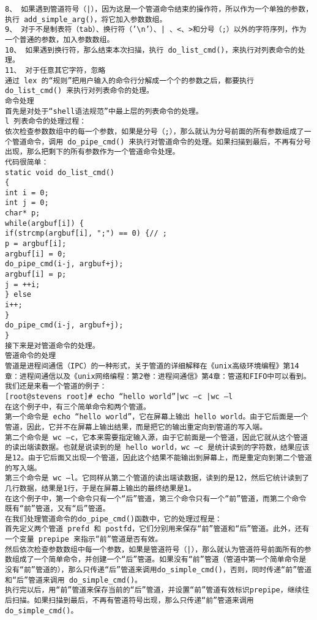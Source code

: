 \begin{lstlisting}
8、 如果遇到管道符号（|），因为这是一个管道命令结束的操作符，所以作为一个单独的参数，执行 add_simple_arg()，将它加入参数数组。 
9、 对于不是制表符（tab）、换行符（’\n’）、| 、<、>和分号（;）以外的字符序列，作为一个普通的参数，加入参数数组。 
10、 如果遇到换行符，那么结束本次扫描，执行 do_list_cmd()，来执行对列表命令的处理。 
11、 对于任意其它字符，忽略 
通过 lex 的“规则”把用户输入的命令行分解成一个个的参数之后，都要执行 do_list_cmd() 来执行对列表命令的处理。 
命令处理 
首先是对处于“shell语法规范”中最上层的列表命令的处理。 
l 列表命令的处理过程： 
依次检查参数数组中的每一个参数，如果是分号（;），那么就认为分号前面的所有参数组成了一个管道命令，调用 do_pipe_cmd() 来执行对管道命令的处理。如果扫描到最后，不再有分号出现，那么把剩下的所有参数作为一个管道命令处理。 
代码很简单： 
static void do_list_cmd() 
{ 
int i = 0; 
int j = 0; 
char* p; 
while(argbuf[i]) { 
if(strcmp(argbuf[i], ";") == 0) {// ; 
p = argbuf[i]; 
argbuf[i] = 0; 
do_pipe_cmd(i-j, argbuf+j); 
argbuf[i] = p; 
j = ++i; 
} else 
i++; 
} 
do_pipe_cmd(i-j, argbuf+j); 
} 
接下来是对管道命令的处理。 
管道命令的处理 
管道是进程间通信（IPC）的一种形式，关于管道的详细解释在《unix高级环境编程》第14章：进程间通信以及《unix网络编程：第2卷：进程间通信》第4章：管道和FIFO中可以看到。 
我们还是来看一个管道的例子： 
[root@stevens root]# echo “hello world”|wc –c |wc –l 
在这个例子中，有三个简单命令和两个管道。 
第一个命令是 echo “hello world”，它在屏幕上输出 hello world。由于它后面是一个管道，因此，它并不在屏幕上输出结果，而是把它的输出重定向到管道的写入端。 
第二个命令是 wc –c，它本来需要指定输入源，由于它前面是一个管道，因此它就从这个管道的读出端读数据。也就是说读到的是 hello world，wc –c 是统计读到的字符数，结果应该是12。由于它后面又出现一个管道，因此这个结果不能输出到屏幕上，而是重定向到第二个管道的写入端。 
第三个命令是 wc –l。它同样从第二个管道的读出端读数据，读到的是12，然后它统计读到了几行数据，结果是1行，于是在屏幕上输出的最终结果是1。 
在这个例子中，第一个命令只有一个“后”管道，第三个命令只有一个“前”管道，而第二个命令既有“前”管道，又有“后”管道。 
在我们处理管道命令的do_pipe_cmd()函数中，它的处理过程是： 
首先定义两个管道 prefd 和 postfd，它们分别用来保存“前”管道和“后”管道。此外，还有一个变量 prepipe 来指示“前”管道是否有效。 
然后依次检查参数数组中每一个参数，如果是管道符号（|），那么就认为管道符号前面所有的参数组成了一个简单命令，并创建一个“后”管道。如果没有“前”管道（管道中第一个简单命令是没有“前”管道的），那么只传递“后”管道来调用do_simple_cmd()，否则，同时传递“前”管道和“后”管道来调用 do_simple_cmd()。 
执行完以后，用“前”管道来保存当前的“后”管道，并设置“前”管道有效标识prepipe，继续往后扫描。如果扫描到最后，不再有管道符号出现，那么只传递“前”管道来调用do_simple_cmd()。 

\end{lstlisting}
